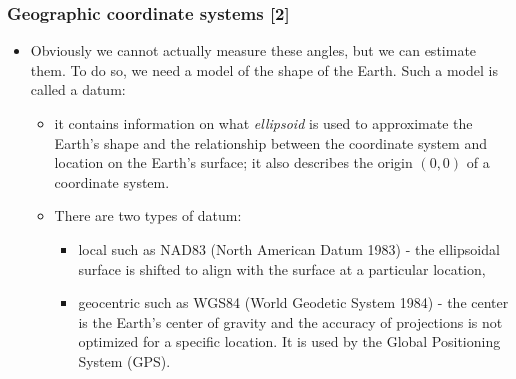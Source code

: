 \documentclass[11pt]{beamer}
\begin{document}


\begin{frame}
\frametitle{Geographic coordinate systems [2]}
\begin{itemize} \setlength\itemsep{\fill}
  \item Obviously we cannot actually measure these angles, but we can estimate them. To do so, we need a model of the shape of the Earth. Such a model is called a \alert{datum}:
   \begin{itemize}\setlength\itemsep{\fill}
   \item it contains information on what \emph{ellipsoid} is used to approximate the Earth's shape and the relationship between the coordinate system and location on the Earth's surface; it also describes the origin $(0,0)$ of a coordinate system.
       \item There are two types of datum:
  \begin{itemize} \setlength\itemsep{\fill}
    \item \alert{local} such as NAD83 (North American Datum 1983) - the ellipsoidal surface is shifted to align with the surface at a particular location,%
    \item \alert{geocentric} such as WGS84 (World Geodetic System 1984) - the center is the Earth's center of gravity and the accuracy of projections is not optimized for a specific location. It is used by the Global Positioning System (GPS).
        \end{itemize}
  \end{itemize}
\end{itemize}
\end{frame}
\end{document}

